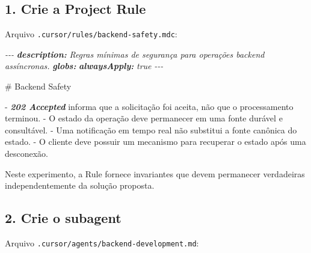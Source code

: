 \documentclass[
  10pt,
  a4paper,
  oneside]{book}
\newenvironment{Shaded}{}{}
\newcommand{\AnnotationTok}[1]{\textcolor[rgb]{0.38,0.63,0.69}{\textbf{\textit{#1}}}}
\newcommand{\CommentTok}[1]{\textcolor[rgb]{0.38,0.63,0.69}{\textit{#1}}}
\newcommand{\FunctionTok}[1]{\textcolor[rgb]{0.02,0.16,0.49}{#1}}
\newcommand{\InformationTok}[1]{\textcolor[rgb]{0.38,0.63,0.69}{\textbf{\textit{#1}}}}
\newcommand{\NormalTok}[1]{#1}
\newcommand{\SpecialStringTok}[1]{\textcolor[rgb]{0.73,0.40,0.53}{#1}}
\renewenvironment{Shaded}{\begin{snugshade}}{\end{snugshade}}%
\begin{document}
\hypertarget{crie-a-project-rule}{%
\subsection{1. Crie a Project Rule}\label{crie-a-project-rule}}

Arquivo \texttt{.cursor/rules/backend-safety.mdc}:

\begin{Shaded}
\begin{Highlighting}[]
\CommentTok{{-}{-}{-}}
\AnnotationTok{description:}\CommentTok{ Regras mínimas de segurança para operações backend assíncronas.}
\AnnotationTok{globs:}
\AnnotationTok{alwaysApply:}\CommentTok{ true}
\CommentTok{{-}{-}{-}}

\FunctionTok{\# Backend Safety}

\SpecialStringTok{{-} }\InformationTok{\textasciigrave{}202 Accepted\textasciigrave{}}\NormalTok{ informa que a solicitação foi aceita, não que o processamento terminou.}
\SpecialStringTok{{-} }\NormalTok{O estado da operação deve permanecer em uma fonte durável e consultável.}
\SpecialStringTok{{-} }\NormalTok{Uma notificação em tempo real não substitui a fonte canônica do estado.}
\SpecialStringTok{{-} }\NormalTok{O cliente deve possuir um mecanismo para recuperar o estado após uma desconexão.}
\end{Highlighting}
\end{Shaded}

Neste experimento, a Rule fornece invariantes que devem permanecer
verdadeiras independentemente da solução proposta.

\hypertarget{crie-o-subagent}{%
\subsection{2. Crie o subagent}\label{crie-o-subagent}}

Arquivo \texttt{.cursor/agents/backend-development.md}:
\end{document}
